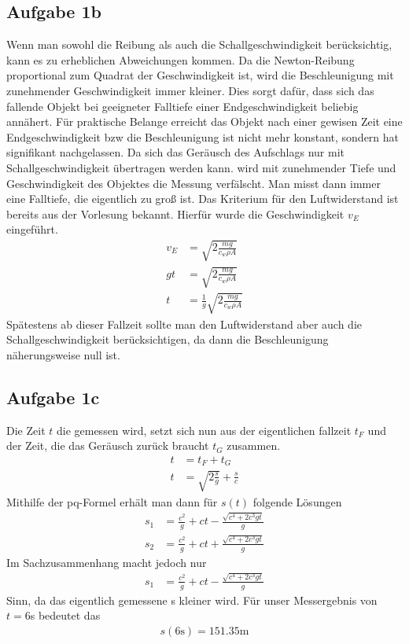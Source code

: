 \documentclass[a4paper,10pt]{extarticle}
\begin{document}
\subsection*{Aufgabe 1b}
Wenn man sowohl die Reibung als auch die Schallgeschwindigkeit berücksichtig, kann es zu erheblichen Abweichungen kommen. Da die Newton-Reibung proportional zum Quadrat der Geschwindigkeit ist, wird die Beschleunigung mit zunehmender Geschwindigkeit immer kleiner. Dies sorgt dafür, dass sich das fallende Objekt bei geeigneter Falltiefe einer Endgeschwindigkeit beliebig annähert. Für praktische Belange erreicht das Objekt nach einer gewisen Zeit eine Endgeschwindigkeit bzw die Beschleunigung ist nicht mehr konstant, sondern hat signifikant nachgelassen. Da sich das Geräusch des Aufschlags nur mit Schallgeschwindigkeit übertragen werden kann. wird mit zunehmender Tiefe und Geschwindigkeit des Objektes die Messung verfälscht. Man misst dann immer eine Falltiefe, die eigentlich zu groß ist. 
Das Kriterium für den Luftwiderstand ist bereits aus der Vorlesung bekannt. Hierfür wurde die Geschwindigkeit $v_E$ eingeführt. 
\begin{align*}
  v_E &= \sqrt{2\frac{mg}{c_w\rho A}}\\
  gt  &= \sqrt{2\frac{mg}{c_w\rho A}}\\
  t   &= \frac{1}{g}\sqrt{2\frac{mg}{c_w\rho A}}
\end{align*}
Spätestens ab dieser Fallzeit sollte man den Luftwiderstand aber auch die Schallgeschwindigkeit berücksichtigen, da dann die Beschleunigung näherungsweise null ist. 

\subsection*{Aufgabe 1c}
Die Zeit $t$ die gemessen wird, setzt sich nun aus der eigentlichen fallzeit $t_F$ und der Zeit, die das Geräusch zurück braucht $t_G$ zusammen.
\begin{align*}
  t &= t_F + t_G\\
  t &= \sqrt{2\frac{s}{g}} + \frac{s}{c} 
\end{align*}
Mithilfe der pq-Formel erhält man dann für $s(t)$ folgende Lösungen
\begin{align*}
  s_1 &= \frac{c^2}{g} + ct - \frac{\sqrt{c^4+2c^3gt}}{g}\\
  s_2 &= \frac{c^2}{g} + ct + \frac{\sqrt{c^4+2c^3gt}}{g}
\end{align*}
Im Sachzusammenhang macht jedoch nur 
\begin{align*}
  s_1 &= \frac{c^2}{g} + ct - \frac{\sqrt{c^4+2c^3gt}}{g}
\end{align*}
Sinn, da das eigentlich gemessene s kleiner wird. 
Für unser Messergebnis von $t = 6$s bedeutet das
\begin{align*}
  s(6\mbox{s}) = 151.35\mbox{m}
\end{align*}
\end{document}
